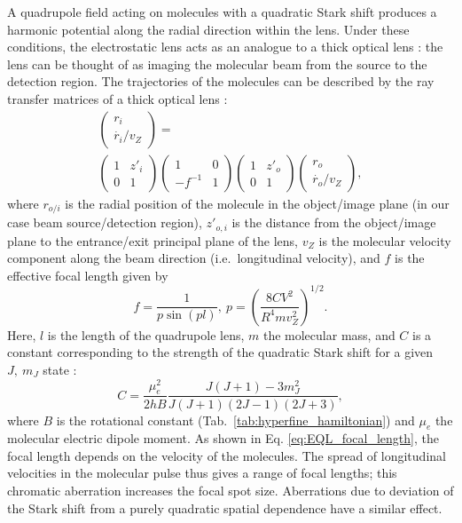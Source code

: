 A quadrupole field acting on molecules with a quadratic Stark shift produces a harmonic potential along the radial direction within the lens. Under these conditions, the electrostatic lens acts as an analogue to a thick optical lens \cite{bennewitz1955fokussierung}: the lens can be thought of as imaging the molecular beam from the source to the detection region. The trajectories of the molecules can be described by the ray transfer matrices of a thick optical lens \cite{berg1965determination, cho1991tight}:
\begin{equation}
    \begin{gathered}
    \begin{pmatrix}
		r_i \\
		\dot{r_i}/v_Z
	\end{pmatrix}
	= \\
	\begin{pmatrix}
	    1 & z'_i \\
	    0 & 1 
	\end{pmatrix}
	\begin{pmatrix}
		1 & 0 \\
		-f^{-1} & 1
	\end{pmatrix}
	\begin{pmatrix}
	    1 & z'_o \\
	    0 & 1 
	\end{pmatrix}
	\begin{pmatrix}
		r_o\\
		\dot{r_o}/v_Z
	\end{pmatrix},
	\end{gathered}
\end{equation}
where $r_{o/i}$ is the radial position of the molecule in the object/image plane (in our case beam source/detection region), $z'_{o,i}$ is the distance from the object/image plane to the entrance/exit principal plane of the lens, $v_Z$ is the molecular velocity component along the beam direction (i.e.\ longitudinal velocity), and $f$ is the effective focal length given by
\begin{equation}
    \label{eq:EQL_focal_length}
	f = \frac{1}{p\sin\left( pl\right)},~p=\left(\frac{8CV^2}{R^4 m v_Z^2} \right)^{1/2}.
\end{equation}
Here, $l$ is the length of the quadrupole lens, $m$ the molecular mass, and $C$ is a constant corresponding to the strength of the quadratic Stark shift for a given $J,~m_J$ state \cite{brown2003rotational}:
\begin{equation}
    C = \frac{\mu_e^2}{2hB}\frac{J\left(J+1\right)-3m_J^2}{J\left(J+1\right)\left(2J-1\right)\left(2J+3\right)},
\end{equation}
where $B$ is the rotational constant (Tab.~\ref{tab:hyperfine_hamiltonian}) and $\mu_e$ the molecular electric dipole moment. As shown in Eq. \ref{eq:EQL_focal_length}, the focal length depends on the velocity of the molecules. The spread of longitudinal velocities in the molecular pulse thus gives a range of focal lengths; this chromatic aberration increases the focal spot size. Aberrations due to deviation of the Stark shift from a purely quadratic spatial dependence have a similar effect.

